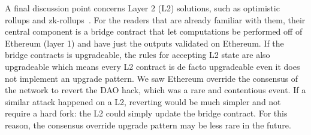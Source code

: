 A final discussion point concerns Layer 2 (L2) solutions, such as optimistic rollups and zk-rollups~\cite{mccorry2021sok}. For the readers that are already familiar with them, their central component is a bridge contract that let computations be performed off of Ethereum (layer 1) and have just the outputs validated on Ethereum. If the bridge contracts is upgradeable, the rules for accepting L2 state are also upgradeable which means every L2 contract is de facto upgradeable even it does not implement an upgrade pattern. We saw Ethereum override the consensus of the network to revert the DAO hack, which was a rare and contentious event. If a similar attack happened on a L2, reverting would be much simpler and not require a hard fork: the L2 could simply update the bridge contract. For this reason, the consensus override upgrade pattern may be less rare in the future. 

